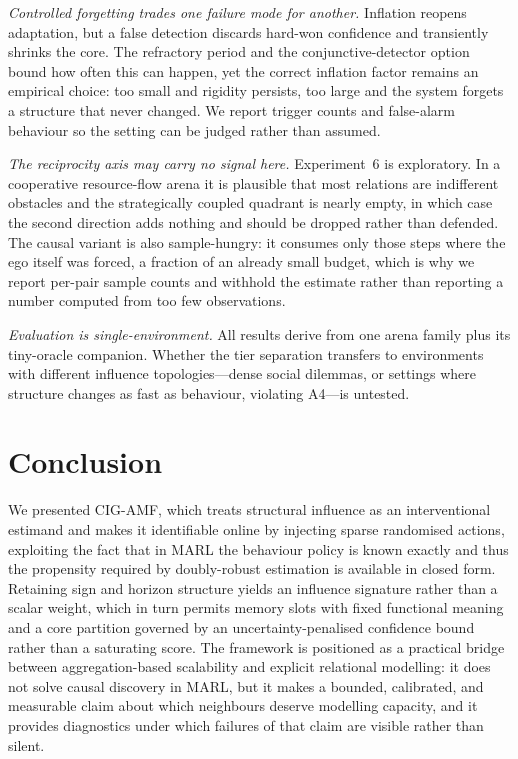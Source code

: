 \documentclass[conference]{IEEEtran}
\begin{document}
\emph{Controlled forgetting trades one failure mode for another.} Inflation reopens adaptation, but a false detection discards hard-won confidence and transiently shrinks the core. The refractory period and the conjunctive-detector option bound how often this can happen, yet the correct inflation factor remains an empirical choice: too small and rigidity persists, too large and the system forgets a structure that never changed. We report trigger counts and false-alarm behaviour so the setting can be judged rather than assumed.

\emph{The reciprocity axis may carry no signal here.} Experiment~6 is exploratory. In a cooperative resource-flow arena it is plausible that most relations are indifferent obstacles and the strategically coupled quadrant is nearly empty, in which case the second direction adds nothing and should be dropped rather than defended. The causal variant is also sample-hungry: it consumes only those steps where the ego itself was forced, a fraction of an already small budget, which is why we report per-pair sample counts and withhold the estimate rather than reporting a number computed from too few observations.

\emph{Evaluation is single-environment.} All results derive from one arena family plus its tiny-oracle companion. Whether the tier separation transfers to environments with different influence topologies---dense social dilemmas, or settings where structure changes as fast as behaviour, violating A4---is untested.

\section{Conclusion}

We presented CIG-AMF, which treats structural influence as an interventional estimand and makes it identifiable online by injecting sparse randomised actions, exploiting the fact that in MARL the behaviour policy is known exactly and thus the propensity required by doubly-robust estimation is available in closed form. Retaining sign and horizon structure yields an influence signature rather than a scalar weight, which in turn permits memory slots with fixed functional meaning and a core partition governed by an uncertainty-penalised confidence bound rather than a saturating score. The framework is positioned as a practical bridge between aggregation-based scalability and explicit relational modelling: it does not solve causal discovery in MARL, but it makes a bounded, calibrated, and measurable claim about which neighbours deserve modelling capacity, and it provides diagnostics under which failures of that claim are visible rather than silent.
\end{document}
